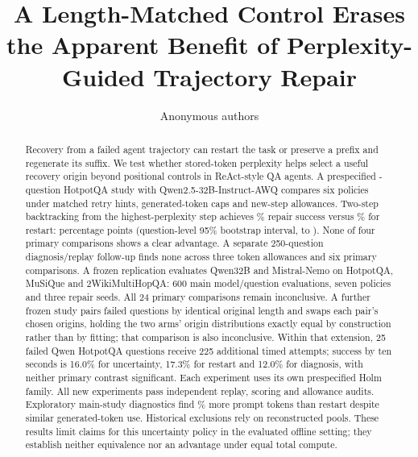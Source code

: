\documentclass{article}
\title{A Length-Matched Control Erases the Apparent Benefit of Perplexity-Guided Trajectory Repair}
\author{Anonymous authors}
\newif\ifsubmission
\begin{document}
\maketitle
\ifsubmission
  \fancyhead[L]{Under review as a conference paper at ICLR 2027}
\else
\fi

\begin{abstract}
Recovery from a failed agent trajectory can restart the task or preserve
a prefix and regenerate its suffix. We test whether stored-token perplexity
helps select a useful recovery origin beyond positional controls in
ReAct-style QA agents. A prespecified \MainInitial{}-question HotpotQA study
with Qwen2.5-32B-Instruct-AWQ compares six policies under matched retry hints,
generated-token caps and new-step allowances. Two-step backtracking from
the highest-perplexity step achieves \MainTreatmentRate\% repair success
versus \MainRestartRate\% for restart: \MainRestartDelta{} percentage points
(question-level 95\% bootstrap interval, \MainRestartLow{} to \MainRestartHigh{}).
None of four primary comparisons shows a clear advantage. A separate
250-question diagnosis/replay follow-up finds none across three token
allowances and six primary comparisons. A frozen replication evaluates
Qwen32B and Mistral-Nemo on HotpotQA, MuSiQue and 2WikiMultiHopQA: 600 main
model/question evaluations, seven policies and three repair seeds. All 24
primary comparisons remain inconclusive. A further frozen study pairs failed
questions by identical original length and swaps each pair's chosen origins,
holding the two arms' origin distributions exactly equal by construction rather
than by fitting; that comparison is also inconclusive. Within that extension, 25 failed
Qwen HotpotQA questions receive 225 additional timed attempts; success by
ten seconds is 16.0\% for uncertainty, 17.3\% for restart and 12.0\% for
diagnosis, with neither primary contrast significant. Each experiment
uses its own prespecified Holm family. All new experiments pass independent
replay, scoring and allowance audits. Exploratory main-study diagnostics
find \ReviewPromptIncrease\% more prompt tokens than restart despite similar
generated-token use. Historical exclusions rely on reconstructed pools.
These results limit claims for this uncertainty policy in the evaluated
offline setting; they establish neither equivalence nor an advantage under
equal total compute.
\end{abstract}
\end{document}

